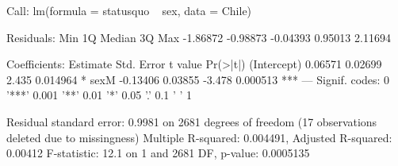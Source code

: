 \begin{Schunk}
\begin{Soutput}
Call:
lm(formula = statusquo ~ sex, data = Chile)

Residuals:
     Min       1Q   Median       3Q      Max 
-1.86872 -0.98873 -0.04393  0.95013  2.11694 

Coefficients:
            Estimate Std. Error t value Pr(>|t|)    
(Intercept)  0.06571    0.02699   2.435 0.014964 *  
sexM        -0.13406    0.03855  -3.478 0.000513 ***
---
Signif. codes:  0 '***' 0.001 '**' 0.01 '*' 0.05 '.' 0.1 ' ' 1

Residual standard error: 0.9981 on 2681 degrees of freedom
  (17 observations deleted due to missingness)
Multiple R-squared:  0.004491,	Adjusted R-squared:  0.00412 
F-statistic:  12.1 on 1 and 2681 DF,  p-value: 0.0005135
\end{Soutput}
\end{Schunk}
